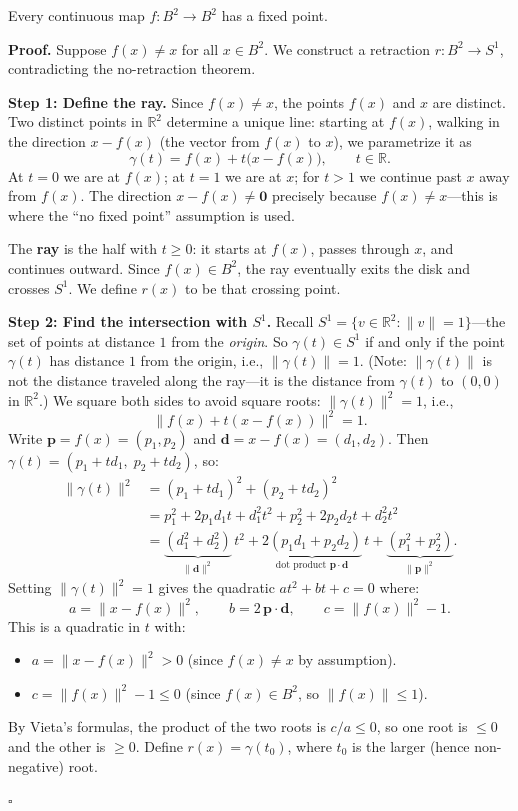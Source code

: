 \documentclass[11pt]{report}
\renewenvironment{proof}[1][Proof]{\noindent\textbf{#1.} }{\hfill$\square$\par\vspace{5pt}}
\begin{document}
\begin{thmbox}
Every continuous map $f: B^2 \to B^2$ has a fixed point.
\end{thmbox}

\begin{proof}
Suppose $f(x) \neq x$ for all $x \in B^2$. We construct a retraction $r: B^2 \to S^1$, contradicting the no-retraction theorem.

\textbf{Step 1: Define the ray.} Since $f(x) \neq x$, the points $f(x)$ and $x$ are distinct. Two distinct points in $\mathbb{R}^2$ determine a unique line: starting at $f(x)$, walking in the direction $x - f(x)$ (the vector from $f(x)$ to $x$), we parametrize it as
\[\gamma(t) = f(x) + t\bigl(x - f(x)\bigr), \qquad t \in \mathbb{R}.\]
At $t = 0$ we are at $f(x)$; at $t = 1$ we are at $x$; for $t > 1$ we continue past $x$ away from $f(x)$. The direction $x - f(x) \neq \mathbf{0}$ precisely because $f(x) \neq x$---this is where the ``no fixed point'' assumption is used.

The \textbf{ray} is the half with $t \geq 0$: it starts at $f(x)$, passes through $x$, and continues outward. Since $f(x) \in B^2$, the ray eventually exits the disk and crosses $S^1$. We define $r(x)$ to be that crossing point.

\textbf{Step 2: Find the intersection with $S^1$.} Recall $S^1 = \{v \in \mathbb{R}^2 : \|v\| = 1\}$---the set of points at distance $1$ from the \emph{origin}. So $\gamma(t) \in S^1$ if and only if the point $\gamma(t)$ has distance $1$ from the origin, i.e., $\|\gamma(t)\| = 1$. (Note: $\|\gamma(t)\|$ is not the distance traveled along the ray---it is the distance from $\gamma(t)$ to $(0,0)$ in $\mathbb{R}^2$.) We square both sides to avoid square roots: $\|\gamma(t)\|^2 = 1$, i.e.,
\[\|f(x) + t(x - f(x))\|^2 = 1.\]
Write $\mathbf{p} = f(x) = (p_1, p_2)$ and $\mathbf{d} = x - f(x) = (d_1, d_2)$. Then $\gamma(t) = (p_1 + td_1,\; p_2 + td_2)$, so:
\begin{align*}
\|\gamma(t)\|^2 &= (p_1 + td_1)^2 + (p_2 + td_2)^2 \\
&= p_1^2 + 2p_1 d_1 t + d_1^2 t^2 + p_2^2 + 2p_2 d_2 t + d_2^2 t^2 \\
&= \underbrace{(d_1^2 + d_2^2)}_{\|\mathbf{d}\|^2}\,t^2 + \underbrace{2(p_1 d_1 + p_2 d_2)}_{\text{dot product }\mathbf{p} \cdot \mathbf{d}}\,t + \underbrace{(p_1^2 + p_2^2)}_{\|\mathbf{p}\|^2}.
\end{align*}
Setting $\|\gamma(t)\|^2 = 1$ gives the quadratic $at^2 + bt + c = 0$ where:
\[a = \|x - f(x)\|^2, \qquad b = 2\,\mathbf{p} \cdot \mathbf{d}, \qquad c = \|f(x)\|^2 - 1.\]
This is a quadratic in $t$ with:
\begin{itemize}[nosep]
    \item $a = \|x - f(x)\|^2 > 0$ (since $f(x) \neq x$ by assumption).
    \item $c = \|f(x)\|^2 - 1 \leq 0$ (since $f(x) \in B^2$, so $\|f(x)\| \leq 1$).
\end{itemize}
By Vieta's formulas, the product of the two roots is $c/a \leq 0$, so one root is $\leq 0$ and the other is $\geq 0$. Define $r(x) = \gamma(t_0)$, where $t_0$ is the larger (hence non-negative) root.


\end{proof}
\end{document}
